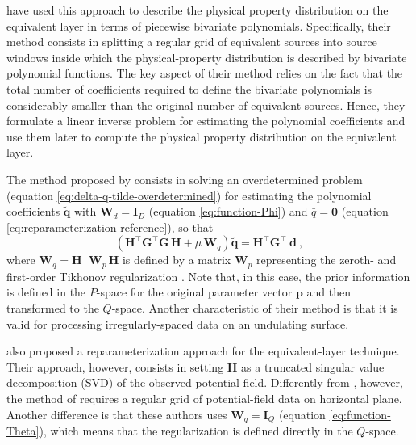 \cite{oliveirajr-etal2013} have used this approach to describe the physical property distribution on the
equivalent layer in terms of piecewise bivariate polynomials.
Specifically, their method consists in splitting a regular grid of equivalent sources into 
source windows inside which the physical-property distribution is described by bivariate polynomial 
functions. The key aspect of their method relies on the fact that the total number of coefficients 
required to define the bivariate polynomials is considerably smaller than the original number of equivalent sources. 
Hence, they formulate a linear inverse problem for estimating the polynomial coefficients and use them later
to compute the physical property distribution on the equivalent layer. 

The method proposed by \cite{oliveirajr-etal2013} consists in solving an overdetermined problem 
(equation \ref{eq:delta-q-tilde-overdetermined}) for estimating the polynomial coefficients 
$\tilde{\mathbf{q}}$ with $\mathbf{W}_{d} = \mathbf{I}_{D}$ (equation \ref{eq:function-Phi}) and
$\bar{q} = \mathbf{0}$ (equation \ref{eq:reparameterization-reference}), so that
\begin{equation}
	\left( \mathbf{H}^{\top} \mathbf{G}^{\top} \mathbf{G} \, \mathbf{H} + 
	\mu \, \mathbf{W}_{q} \right) 
	\tilde{\mathbf{q}} = 
	\mathbf{H}^{\top} \mathbf{G}^{\top} \: \mathbf{d} \: ,
	\label{eq:q-tilde-OBU13}
\end{equation}
where $\mathbf{W}_{q} = \mathbf{H}^{\top}\mathbf{W}_{p} \, \mathbf{H}$ is defined by a matrix $\mathbf{W}_{p}$
representing the zeroth- and first-order Tikhonov regularization \cite[e.g.,][p. 103]{aster_etal2019}.
Note that, in this case, the prior information is defined in the $P$-space for the original parameter vector $\mathbf{p}$
and then transformed to the $Q$-space.
Another characteristic of their method is that it is valid for processing irregularly-spaced data
on an undulating surface.

\cite{mendonca-2020} also proposed a reparameterization approach for the equivalent-layer technique.
Their approach, however, consists in setting $\mathbf{H}$ as a truncated singular value decomposition
(SVD) \cite[e.g.,][p. 55]{aster_etal2019} of the observed potential field. 
Differently from \cite{oliveirajr-etal2013}, however, the method of \cite{mendonca-2020} requires 
a regular grid of potential-field data on horizontal plane.
Another difference is that these authors uses $\mathbf{W}_{q} = \mathbf{I}_{Q}$ (equation \ref{eq:function-Theta}),
which means that the regularization is defined directly in the $Q$-space.


